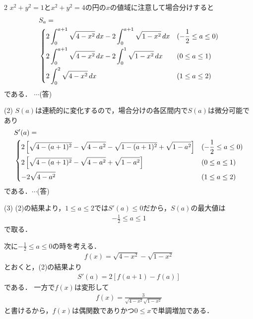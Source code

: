 \documentclass[../../../../main.tex]{subfiles}
\begin{document}
\begin{multicols}{2}
  $x^2+y^2=1$と$x^2+y^2=4$の円の$x$の値域に注意して場合分けすると
  \begin{align*}
     & S_a =                                                                                              \\
     & \begin{dcases}
         2 \int_0^{a+1} \sqrt{4-x^2} \, dx - 2 \int_0^{a+1} \sqrt{1-x^2} \, dx & (-\frac{1}{2} \le a \le 0) \\
         2 \int_0^{a+1} \sqrt{4-x^2} \, dx - 2 \int_0^{1} \sqrt{1-x^2} \, dx   & (0 \le a \le 1)            \\
         2 \int_0^{2} \sqrt{4-x^2} \, dx                                       & (1 \le a \le 2)
       \end{dcases}
  \end{align*}
  である．  $\cdots$(答)

  \vspace{10pt}
  (2)
  $S(a)$は連続的に変化するので，場合分けの各区間内で$S(a)$は微分可能であり
  \begin{align*}
     & S'(a) =                                                                                                                                      \\
     & \begin{dcases}
         2\left[\sqrt{4-(a+1)^2} - \sqrt{4-a^2} - \sqrt{1-(a+1)^2} + \sqrt{1-a^2}\right] & (-\frac{1}{2} \le a \le 0) \\
         2\left[\sqrt{4-(a+1)^2} - \sqrt{4-a^2} + \sqrt{1-a^2}\right]                    & (0 \le a \le 1)            \\
         -2\sqrt{4-a^2}                                                                  & (1 \le a \le 2)
       \end{dcases}
  \end{align*}
  である．$\cdots$(答)

  \vspace{10pt}
  (3)
  (2)の結果より，$1\le a \le 2$では$S'(a)\le 0$だから，$S(a)$の最大値は
  \begin{align*}
    -\frac{1}{2} \le a \le 1
  \end{align*}
  で取る．

  次に$-\frac{1}{2}\le a \le 0$の時を考える．
  \begin{align*}
    f(x) = \sqrt{4-x^2} - \sqrt{1-x^2}
  \end{align*}
  とおくと，(2)の結果より
  \begin{align*}
    S'(a) = 2\left[f(a+1)-f(a)\right]
  \end{align*}
  である．
  一方で$f(x)$は変形して
  \begin{align*}
    f(x) = \frac{3}{\sqrt{4-x^2}\sqrt{1-x^2}}
  \end{align*}
  と書けるから，$f(x)$は偶関数でありかつ$0 \le x$で単調増加である．


\end{multicols}
\end{document}
